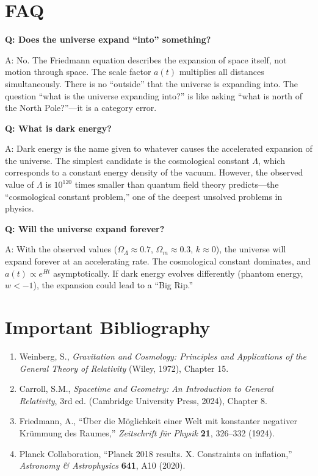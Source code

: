 \documentclass[11pt,openright]{book}
\begin{document}
\section*{FAQ}

\textbf{Q: Does the universe expand ``into'' something?}

A: No. The Friedmann equation describes the expansion of space itself, not motion through space. The scale factor $a(t)$ multiplies all distances simultaneously. There is no ``outside'' that the universe is expanding into. The question ``what is the universe expanding into?'' is like asking ``what is north of the North Pole?''---it is a category error.

\textbf{Q: What is dark energy?}

A: Dark energy is the name given to whatever causes the accelerated expansion of the universe. The simplest candidate is the cosmological constant $\Lambda$, which corresponds to a constant energy density of the vacuum. However, the observed value of $\Lambda$ is $10^{120}$ times smaller than quantum field theory predicts---the ``cosmological constant problem,'' one of the deepest unsolved problems in physics.

\textbf{Q: Will the universe expand forever?}

A: With the observed values ($\Omega_\Lambda \approx 0.7$, $\Omega_m \approx 0.3$, $k \approx 0$), the universe will expand forever at an accelerating rate. The cosmological constant dominates, and $a(t) \propto e^{Ht}$ asymptotically. If dark energy evolves differently (phantom energy, $w < -1$), the expansion could lead to a ``Big Rip.''
\section*{Important Bibliography}

\begin{enumerate}
\item Weinberg, S., \textit{Gravitation and Cosmology: Principles and Applications of the General Theory of Relativity} (Wiley, 1972), Chapter 15.
\item Carroll, S.M., \textit{Spacetime and Geometry: An Introduction to General Relativity}, 3rd ed. (Cambridge University Press, 2024), Chapter 8.
\item Friedmann, A., ``\"Uber die M\"oglichkeit einer Welt mit konstanter negativer Kr\"ummung des Raumes,'' \textit{Zeitschrift f\"ur Physik} \textbf{21}, 326--332 (1924).
\item Planck Collaboration, ``Planck 2018 results. X. Constraints on inflation,'' \textit{Astronomy \& Astrophysics} \textbf{641}, A10 (2020).
\end{enumerate}
\end{document}
